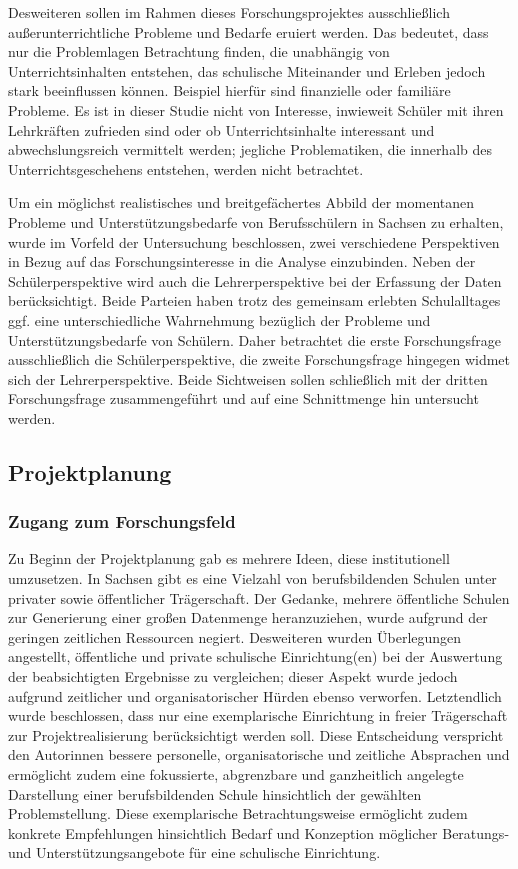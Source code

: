 Desweiteren sollen im Rahmen dieses Forschungsprojektes ausschließlich außerunterrichtliche Probleme und Bedarfe eruiert werden. Das bedeutet, dass nur die Problemlagen Betrachtung finden, die unabhängig von Unterrichtsinhalten entstehen, das schulische Miteinander und Erleben jedoch stark beeinflussen können. Beispiel hierfür sind finanzielle oder familiäre Probleme. Es ist in dieser Studie nicht von Interesse, inwieweit Schüler mit ihren Lehrkräften zufrieden sind oder ob Unterrichtsinhalte interessant und abwechslungsreich vermittelt werden; jegliche Problematiken, die innerhalb des Unterrichtsgeschehens entstehen, werden nicht betrachtet. 

Um ein möglichst realistisches und breitgefächertes Abbild der momentanen Probleme und Unterstützungsbedarfe von Berufsschülern in Sachsen zu erhalten, wurde im Vorfeld der Untersuchung beschlossen, zwei verschiedene Perspektiven in Bezug auf das Forschungsinteresse in die Analyse einzubinden. Neben der Schülerperspektive wird auch die Lehrerperspektive bei der Erfassung der Daten berücksichtigt. Beide Parteien haben trotz des gemeinsam erlebten Schulalltages ggf. eine unterschiedliche Wahrnehmung bezüglich der Probleme und Unterstützungsbedarfe von Schülern. Daher betrachtet die erste Forschungsfrage ausschließlich die Schülerperspektive, die zweite Forschungsfrage hingegen widmet sich der Lehrerperspektive. Beide Sichtweisen sollen schließlich mit der dritten Forschungsfrage zusammengeführt und auf eine Schnittmenge hin untersucht werden.

\subsection{Projektplanung}
\label{sec:Projektplanung}

\subsubsection{Zugang zum Forschungsfeld}
\label{sec:ZugangZumForschungsfeld}

Zu Beginn der Projektplanung gab es mehrere Ideen, diese institutionell umzusetzen. In Sachsen gibt es eine Vielzahl von berufsbildenden Schulen unter privater sowie öffentlicher Trägerschaft. Der Gedanke, mehrere öffentliche Schulen zur Generierung einer großen Datenmenge heranzuziehen, wurde aufgrund der geringen zeitlichen Ressourcen negiert. Desweiteren wurden Überlegungen angestellt, öffentliche und private schulische Einrichtung(en) bei der Auswertung der beabsichtigten Ergebnisse zu vergleichen; dieser Aspekt wurde jedoch aufgrund zeitlicher und organisatorischer Hürden ebenso verworfen. Letztendlich wurde beschlossen, dass nur eine exemplarische Einrichtung in freier Trägerschaft zur Projektrealisierung berücksichtigt werden soll. Diese Entscheidung verspricht den Autorinnen bessere personelle, organisatorische und zeitliche Absprachen und ermöglicht zudem eine fokussierte, abgrenzbare und ganzheitlich angelegte Darstellung einer berufsbildenden Schule hinsichtlich der gewählten Problemstellung. Diese exemplarische  Betrachtungsweise ermöglicht zudem konkrete Empfehlungen hinsichtlich Bedarf und Konzeption möglicher Beratungs- und Unterstützungsangebote für eine schulische Einrichtung.

